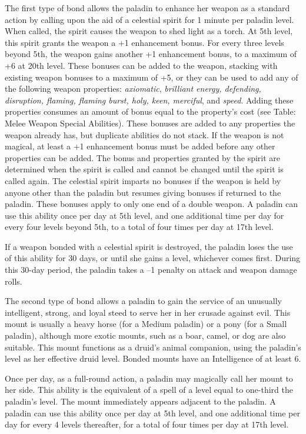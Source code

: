 The first type of bond allows the paladin to enhance her weapon as a standard action by calling upon the aid of a celestial spirit for 1 minute per paladin level. When called, the spirit causes the weapon to shed light as a torch. At 5th level, this spirit grants the weapon a +1 enhancement bonus. For every three levels beyond 5th, the weapon gains another +1 enhancement bonus, to a maximum of +6 at 20th level. These bonuses can be added to the weapon, stacking with existing weapon bonuses to a maximum of +5, or they can be used to add any of the following weapon properties: \textit{axiomatic}, \textit{brilliant energy, defending, disruption, flaming, flaming burst, holy, keen, merciful}, and \textit{speed}. Adding these properties consumes an amount of bonus equal to the property's cost (see Table: Melee Weapon Special Abilities). These bonuses are added to any properties the weapon already has, but duplicate abilities do not stack. If the weapon is not magical, at least a +1 enhancement bonus must be added before any other properties can be added. The bonus and properties granted by the spirit are determined when the spirit is called and cannot be changed until the spirit is called again. The celestial spirit imparts no bonuses if the weapon is held by anyone other than the paladin but resumes giving bonuses if returned to the paladin. These bonuses apply to only one end of a double weapon. A paladin can use this ability once per day at 5th level, and one additional time per day for every four levels beyond 5th, to a total of four times per day at 17th level.
				
If a weapon bonded with a celestial spirit is destroyed, the paladin loses the use of this ability for 30 days, or until she gains a level, whichever comes first. During this 30-day period, the paladin takes a --1 penalty on attack and weapon damage rolls.
				
The second type of bond allows a paladin to gain the service of an unusually intelligent, strong, and loyal steed to serve her in her crusade against evil. This mount is usually a heavy horse (for a Medium paladin) or a pony (for a Small paladin), although more exotic mounts, such as a boar, camel, or dog are also suitable. This mount functions as a druid's animal companion, using the paladin's level as her effective druid level. Bonded mounts have an Intelligence of at least 6. 
				
Once per day, as a full-round action, a paladin may magically call her mount to her side. This ability is the equivalent of a spell of a level equal to one-third the paladin's level. The mount immediately appears adjacent to the paladin. A paladin can use this ability once per day at 5th level, and one additional time per day for every 4 levels thereafter, for a total of four times per day at 17th level.
				

